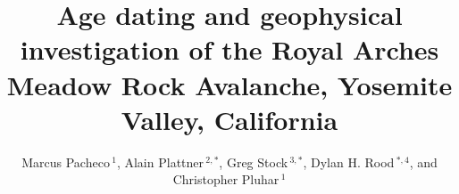 \documentclass[utf8]{frontiersSCNS}
\def\firstAuthorLast{Pacheco {et~al.}} %
\def\Authors{Marcus Pacheco\,$^{1}$, Alain Plattner\,$^{2,*}$, Greg Stock\,$^{3,*}$, Dylan H. Rood\,$^{*,4}$, and Christopher Pluhar\,$^{1}$}
\begin{document}
\onecolumn
{}


\title[Royal Arches Meadow rock avalanche]{Age dating and geophysical investigation of the Royal Arches Meadow Rock Avalanche, Yosemite Valley, California}

\author[\firstAuthorLast ]{\Authors} %
\address{} %
\correspondance{} %

\extraAuth{}%







\maketitle
\end{document}
